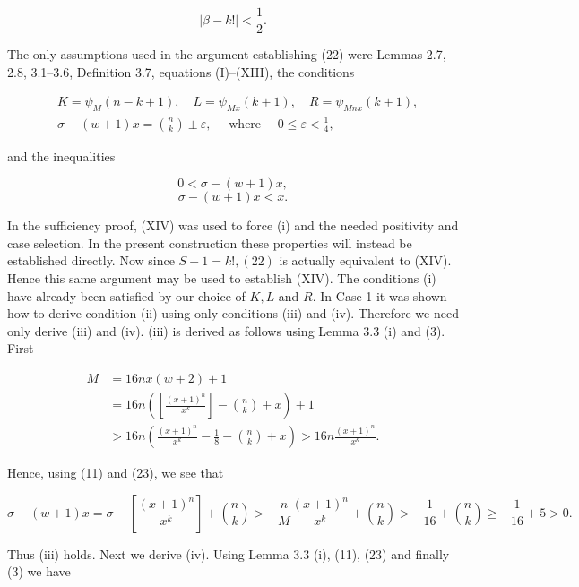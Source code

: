 \documentclass[10pt,letterpaper]{article}
\begin{document}
\begin{equation*}
|\beta-k!|<\frac{1}{2} . \tag{22}
\end{equation*}


The only assumptions used in the argument establishing (22) were Lemmas 2.7, 2.8, 3.1--3.6, Definition 3.7, equations (I)--(XIII), the conditions


\begin{align*}
& K=\psi_{M}(n-k+1), \quad L=\psi_{M x}(k+1), \quad R=\psi_{M n x}(k+1),  \tag{i}\\
& \sigma-(w+1) x=\binom{n}{k} \pm \varepsilon, \quad \text { where } \quad 0 \leq \varepsilon<\frac{1}{4}, \tag{ii}
\end{align*}


and the inequalities


\begin{equation*}
0<\sigma-(w+1)x,\tag{iii}
\end{equation*}
\begin{equation*}
\sigma-(w+1)x<x.\tag{iv}
\end{equation*}


In the sufficiency proof, (XIV) was used to force (i) and the needed positivity and case selection. In the present construction these properties will instead be established directly. Now since $S+1=k!,(22)$ is actually equivalent to (XIV). Hence this same argument may be used to establish (XIV). The conditions (i) have already been satisfied by our choice of $K, L$ and $R$. In Case 1 it was shown how to derive condition (ii) using only conditions (iii) and (iv). Therefore we need only derive (iii) and (iv). (iii) is derived as follows using Lemma 3.3 (i) and (3). First


\begin{equation*}
\begin{aligned}
M&=16nx(w+2)+1\\
 &=16n\left(\left[\frac{(x+1)^n}{x^k}\right]-\binom nk+x\right)+1\\
 &>16n\left(\frac{(x+1)^n}{x^k}-\frac18-\binom nk+x\right)
 >16n\frac{(x+1)^n}{x^k}.
\end{aligned}\tag{23}
\end{equation*}


Hence, using (11) and (23), we see that

\[
\sigma-(w+1) x=\sigma-\left[\frac{(x+1)^{n}}{x^{k}}\right]+\binom{n}{k}>-\frac{n}{M} \frac{(x+1)^{n}}{x^{k}}+\binom{n}{k}>-\frac{1}{16}+\binom{n}{k} \geq-\frac{1}{16}+5>0 .
\]

Thus (iii) holds. Next we derive (iv). Using Lemma 3.3 (i), (11), (23) and finally (3) we have
\end{document}

